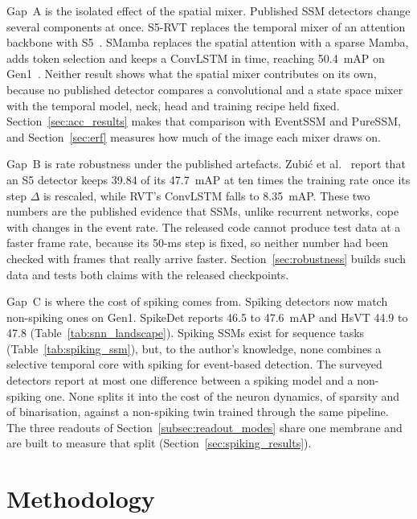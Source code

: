 \documentclass[11pt, a4paper]{report}
\begin{document}
Gap~A is the isolated effect of the spatial mixer. Published SSM detectors change several components
at once. S5-RVT replaces the temporal mixer of an attention backbone with S5~\cite{zubic2024state}. SMamba
replaces the spatial attention with a sparse Mamba, adds token selection and keeps a ConvLSTM in time,
reaching 50.4~mAP on Gen1~\cite{yang2025smamba}. Neither result shows what the spatial mixer contributes on
its own, because no published detector compares a convolutional and a state space mixer with the temporal
model, neck, head and training recipe held fixed. Section~\ref{sec:acc_results} makes that comparison with
EventSSM and PureSSM, and Section~\ref{sec:erf} measures how much of the image each mixer draws on.

Gap~B is rate robustness under the published artefacts. Zubi\'{c} et al.~\cite{zubic2024state}
report that an S5 detector keeps 39.84 of its 47.7~mAP at ten times the training rate once its step
$\Delta$ is rescaled, while RVT's ConvLSTM falls to 8.35~mAP. These two numbers are the published evidence
that SSMs, unlike recurrent networks, cope with changes in the event rate. The released code cannot produce
test data at a faster frame rate, because its 50-ms step is fixed, so neither number had been checked with
frames that really arrive faster. Section~\ref{sec:robustness} builds such data and tests both claims with
the released checkpoints.

Gap~C is where the cost of spiking comes from. Spiking detectors now match non-spiking ones on Gen1. SpikeDet reports 46.5 to 47.6~mAP and HsVT 44.9 to 47.8 (Table~\ref{tab:snn_landscape}). Spiking SSMs exist
for sequence tasks (Table~\ref{tab:spiking_ssm}), but, to the author's knowledge, none combines a selective
temporal core with spiking for event-based detection. The surveyed detectors report at most one difference
between a spiking model and a non-spiking one. None splits it into the cost of the neuron dynamics, of
sparsity and of binarisation, against a non-spiking twin trained through the same pipeline. The three
readouts of Section~\ref{subsec:readout_modes} share one membrane and are built to measure that split
(Section~\ref{sec:spiking_results}).


\chapter{Methodology}
\label{ch:method}
\end{document}
